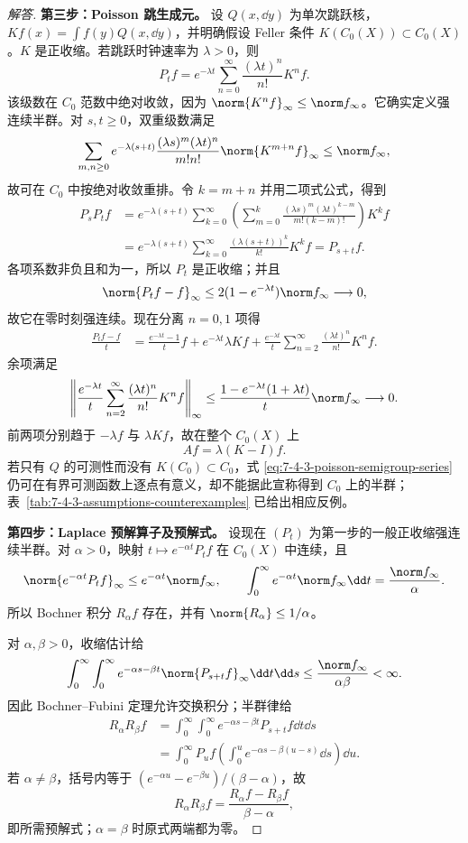 \begin{proof}[解答]
\textbf{第三步：Poisson 跳生成元。}
设 $Q(x,\dd y)$ 为单次跳跃核，
$Kf(x)=\int f(y)Q(x,\dd y)$，并明确假设 Feller 条件
$K(C_0(X))\subset C_0(X)$。$K$ 是正收缩。若跳跃时钟速率为 $\lambda>0$，则
\begin{equation}\label{eq:7-4-3-poisson-semigroup-series}
 P_tf=e^{-\lambda t}\sum_{n=0}^\infty\frac{(\lambda t)^n}{n!}K^nf.
\end{equation}
该级数在 $C_0$ 范数中绝对收敛，因为
$\norm{K^nf}_\infty\le\norm f_\infty$。它确实定义强连续半群。对 $s,t\geq0$，双重级数满足
\[
 \sum_{m,n\geq0}e^{-\lambda(s+t)}
 \frac{(\lambda s)^m(\lambda t)^n}{m!n!}\norm{K^{m+n}f}_\infty
 \leq\norm f_\infty,
\]
故可在 $C_0$ 中按绝对收敛重排。令 $k=m+n$ 并用二项式公式，得到
\begin{align*}
 P_sP_tf
 &=e^{-\lambda(s+t)}
   \sum_{k=0}^\infty
   \left(\sum_{m=0}^k\frac{(\lambda s)^m(\lambda t)^{k-m}}{m!(k-m)!}\right)K^kf\\
 &=e^{-\lambda(s+t)}\sum_{k=0}^\infty
   \frac{(\lambda(s+t))^k}{k!}K^kf
 =P_{s+t}f.
\end{align*}
各项系数非负且和为一，所以 $P_t$ 是正收缩；并且
\[
 \norm{P_tf-f}_\infty
 \leq2(1-e^{-\lambda t})\norm f_\infty\longrightarrow0,
\]
故它在零时刻强连续。现在分离 $n=0,1$ 项得
\begin{align*}
 \frac{P_tf-f}{t}
 &=\frac{e^{-\lambda t}-1}{t}f
 +e^{-\lambda t}\lambda Kf
 +\frac{e^{-\lambda t}}t\sum_{n=2}^\infty\frac{(\lambda t)^n}{n!}K^nf.
\end{align*}
余项满足
\[
 \left\|\frac{e^{-\lambda t}}t
 \sum_{n=2}^\infty\frac{(\lambda t)^n}{n!}K^nf\right\|_\infty
 \le\frac{1-e^{-\lambda t}(1+\lambda t)}t\norm f_\infty\longrightarrow0.
\]
前两项分别趋于 $-\lambda f$ 与 $\lambda Kf$，故在整个 $C_0(X)$ 上
\[
 Af=\lambda(K-I)f.
\]
若只有 $Q$ 的可测性而没有 $K(C_0)\subset C_0$，式
\eqref{eq:7-4-3-poisson-semigroup-series} 仍可在有界可测函数上逐点有意义，却不能据此宣称得到
$C_0$ 上的半群；表~\ref{tab:7-4-3-assumptions-counterexamples} 已给出相应反例。

\textbf{第四步：Laplace 预解算子及预解式。}
设现在 $(P_t)$ 为第一步的一般正收缩强连续半群。对 $\alpha>0$，映射
$t\mapsto e^{-\alpha t}P_tf$ 在 $C_0(X)$ 中连续，且
\[
 \norm{e^{-\alpha t}P_tf}_\infty\le e^{-\alpha t}\norm f_\infty,
 \qquad \int_0^\infty e^{-\alpha t}\norm f_\infty\dd t
 =\frac{\norm f_\infty}{\alpha}.
\]
所以 Bochner 积分 $R_\alpha f$ 存在，并有
$\norm{R_\alpha}\le1/\alpha$。

对 $\alpha,\beta>0$，收缩估计给
\[
 \int_0^\infty\int_0^\infty
 e^{-\alpha s-\beta t}\norm{P_{s+t}f}_\infty\dd t\dd s
 \le\frac{\norm f_\infty}{\alpha\beta}<\infty.
\]
因此 Bochner--Fubini 定理允许交换积分；半群律给
\begin{align*}
 R_\alpha R_\beta f
 &=\int_0^\infty\int_0^\infty
 e^{-\alpha s-\beta t}P_{s+t}f\dd t\dd s\\
 &=\int_0^\infty P_uf
 \left(\int_0^ue^{-\alpha s-\beta(u-s)}\dd s\right)\dd u.
\end{align*}
若 $\alpha\ne\beta$，括号内等于
$(e^{-\alpha u}-e^{-\beta u})/(\beta-\alpha)$，故
\[
 R_\alpha R_\beta f=\frac{R_\alpha f-R_\beta f}{\beta-\alpha},
\]
即所需预解式；$\alpha=\beta$ 时原式两端都为零。


\end{proof}
